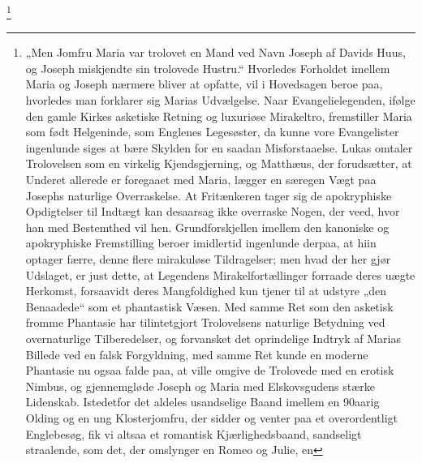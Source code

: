 \documentclass[12pt,a4paper]{book}
\renewcommand{\thefootnote}{*)}
\begin{document}
\footnote{„Men Jomfru Maria var trolovet en Mand ved Navn Joseph af Davids
Huus, og Joseph miskjendte sin trolovede Hustru.“ Hvorledes Forholdet imellem
Maria og Joseph nærmere bliver at opfatte, vil i Hovedsagen beroe paa, hvorledes
man forklarer sig Marias Udvælgelse. Naar Evangelielegenden, ifølge den gamle
Kirkes asketiske Retning og luxuriøse Mirakeltro, fremstiller Maria som født
Helgeninde, som Englenes Legesøster, da kunne vore Evangelister ingenlunde siges
at bære Skylden for en saadan Misforstaaelse. Lukas omtaler Trolovelsen som en
virkelig Kjendsgjerning, og Matthæus, der forudsætter, at Underet allerede er
foregaaet med Maria, lægger en særegen Vægt paa Josephs naturlige Overraskelse.
At Fritænkeren tager sig de apokryphiske Opdigtelser til Indtægt kan desaarsag
ikke overraske Nogen, der veed, hvor han med Bestemthed vil hen.
Grundforskjellen imellem den kanoniske og apokryphiske Fremstilling beroer
imidlertid ingenlunde derpaa, at hiin optager færre, denne flere mirakuløse
Tildragelser; men hvad der her gjør Udslaget, er just dette, at Legendens
Mirakelfortællinger forraade deres uægte Herkomst, forsaavidt deres
Mangfoldighed kun tjener til at udstyre „den Benaadede“ som et phantastisk
Væsen. Med samme Ret som den asketisk fromme Phantasie har tilintetgjort
Trolovelsens naturlige Betydning ved overnaturlige Tilberedelser, og forvansket
det oprindelige Indtryk af Marias Billede ved en falsk Forgyldning, med samme
Ret kunde en moderne Phantasie nu ogsaa falde paa, at ville omgive de Trolovede
med en erotisk Nimbus, og gjennemgløde Joseph og Maria med Elskovsgudens stærke
Lidenskab. Istedetfor det aldeles usandselige Baand imellem en 90aarig Olding og
en ung Klosterjomfru, der sidder og venter paa et overordentligt
Englebesøg, fik vi altsaa et romantisk Kjærlighedsbaand, sandseligt straalende,
som det, der omslynger en Romeo og Julie, en
}
\end{document}
